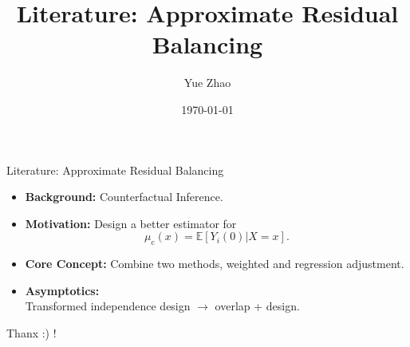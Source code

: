\documentclass[pdf]{beamer}
\title[Literature: Approximate Residual Balancing]{Literature: Approximate Residual Balancing}
\subtitle{}
\author[Yue Zhao]{
	\Large
	Yue Zhao\\
}
\institute{
\\
\large
Beijing Normal University\\
School of Mathematical Sciences}
\theoremstyle{remark}
\theoremstyle{definition}
\begin{document}
	

\date{\today}

\begin{noheadline}
\begin{frame}\maketitle\end{frame}
\end{noheadline}



\begin{frame}{Literature: Approximate Residual Balancing}
\begin{itemize}
	\item \textbf{Background:} Counterfactual Inference.
	\item \textbf{Motivation: }Design a better estimator for $$\mu_{\mathrm{c}}(x)=\mathbb{E}\left[Y_{i}(0) | X=x\right].$$
	\item \textbf{Core Concept:} Combine two methods, weighted and regression adjustment.
	\item \textbf{Asymptotics: } \\ Transformed independence design $\rightarrow$ overlap + design.
\end{itemize}
\end{frame}



\begin{frame}{}
Thanx  :) !
\end{frame}
\end{document}
